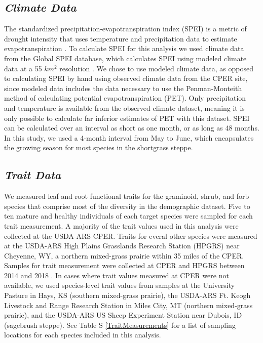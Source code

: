 \documentclass[12pt, letterpaper]{article}
\begin{document}
\subsection{\textit{Climate Data}} The standardized precipitation-evapotranspiration index (SPEI) is a metric of drought intensity that uses temperature and precipitation data to estimate evapotranspiration \citep{Vicente-Serrano2010}.  To calculate SPEI for this analysis we used climate data from the Global SPEI database, which calculates SPEI using modeled climate data at a 55 $km^2$ resolution \citep{Vicente-Serrano2010}. We chose to use modeled climate data, as opposed to calculating SPEI by hand using observed climate data from the CPER site, since modeled data includes the data necessary to use the Penman-Monteith method of calculating potential evapotranspiration (PET). Only precipitation and temperature is available from the observed climate dataset, meaning it is only possible to calculate far inferior estimates of PET with this dataset. SPEI can be calculated over an interval as short as one month, or as long as 48 months. In this study, we used a 4-month interval from May to June, which encapsulates the growing season for most species in the shortgrass steppe. 

\subsection{\textit{Trait Data}} We measured leaf and root functional traits for the graminoid, shrub, and forb species that comprise most of the diversity in the demographic dataset. Five to ten mature and healthy individuals of each target species were sampled for each trait measurement. A majority of the trait values used in this analysis were collected at the USDA-ARS CPER. Traits for everal other species were measured at the USDA-ARS High Plains Grasslands Research Station (HPGRS) near Cheyenne, WY, a northern mixed-grass prairie within 35 miles of the CPER. Samples for trait measurement were collected at CPER and HPGRS between 2014 and 2018 \citep{Blumenthal2020}. In cases where trait values measured at CPER were not available, we used species-level trait values from samples at the University Pasture in Hays, KS (southern mixed-grass prairie), the USDA-ARS Ft. Keogh Livestock and Range Research Station in Miles City, MT (northern mixed-grass prairie), and the USDA-ARS US Sheep Experiment Station near Dubois, ID (sagebrush steppe). See Table S \ref{TraitMeasurements} for a list of sampling locations for each species included in this analysis.  
\end{document}
